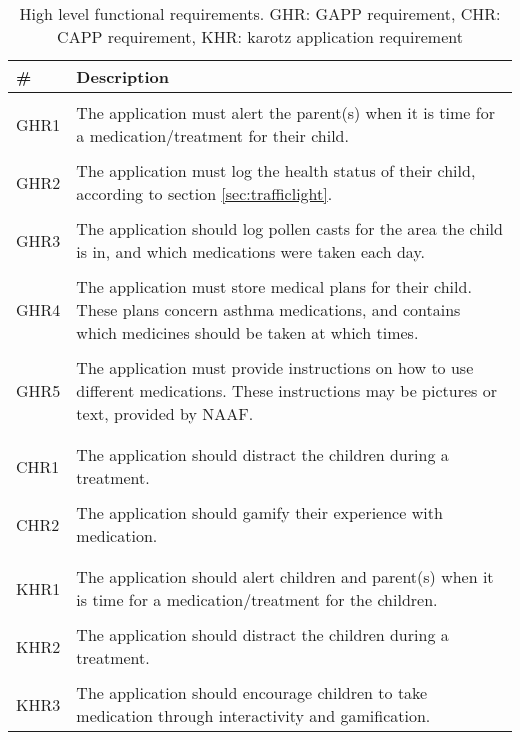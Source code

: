 \begin{table}
\centering
	\begin{tabular}{p{1.5cm}|p{12cm}}
		\hline
		\bf{\#} & \bf{Description} \\  \hline \\

		GHR1 & The application must alert the parent(s) when it is time for a medication/treatment for their child. \\ \\
		GHR2 & The application must log the health status of their child, according to section \ref{sec:trafficlight}. \\ \\ 
		GHR3 & The application should log pollen casts for the area the child is in, and which medications were taken each day.\\ \\ 
		GHR4 & The application must store medical plans for their child. These plans concern asthma medications, and contains which medicines should be taken at which times.\\ \\ 
		GHR5 & The application must provide instructions on how to use different medications. These instructions may be pictures or text, provided by NAAF. \\ \\ \hline \\

		CHR1 & The application should distract the children during a treatment. \\ \\ 
		CHR2 & The application should gamify their experience with medication.  \\ \\ \hline \\

		KHR1 & The application should alert children and parent(s) when it is time for a medication/treatment for the children.  \\ \\ 
		KHR2 & The application should distract the children during a treatment. \\ \\ 
		KHR3 & The application should encourage children to take medication through interactivity and gamification.  \\
		\hline
	\end{tabular}
	\caption[High level functional requirements]{High level functional requirements. GHR: GAPP requirement, CHR: CAPP requirement, KHR: karotz application requirement}
	\label{tab:highfuncitionalrequirements}
\end{table}
\clearpage{}

